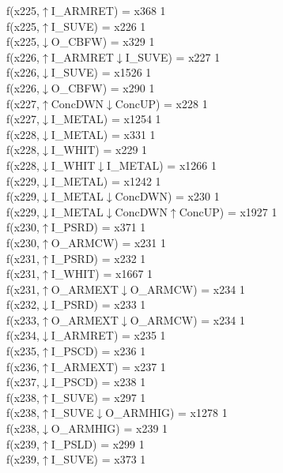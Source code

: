 f(x225,$\uparrow$I\_ARMRET) = x368 {1} \\
f(x225,$\uparrow$I\_SUVE) = x226 {1} \\
f(x225,$\downarrow$O\_CBFW) = x329 {1} \\
f(x226,$\uparrow$I\_ARMRET$\downarrow$I\_SUVE) = x227 {1} \\
f(x226,$\downarrow$I\_SUVE) = x1526 {1} \\
f(x226,$\downarrow$O\_CBFW) = x290 {1} \\
f(x227,$\uparrow$ConcDWN$\downarrow$ConcUP) = x228 {1} \\
f(x227,$\downarrow$I\_METAL) = x1254 {1} \\
f(x228,$\downarrow$I\_METAL) = x331 {1} \\
f(x228,$\downarrow$I\_WHIT) = x229 {1} \\
f(x228,$\downarrow$I\_WHIT$\downarrow$I\_METAL) = x1266 {1} \\
f(x229,$\downarrow$I\_METAL) = x1242 {1} \\
f(x229,$\downarrow$I\_METAL$\downarrow$ConcDWN) = x230 {1} \\
f(x229,$\downarrow$I\_METAL$\downarrow$ConcDWN$\uparrow$ConcUP) = x1927 {1} \\
f(x230,$\uparrow$I\_PSRD) = x371 {1} \\
f(x230,$\uparrow$O\_ARMCW) = x231 {1} \\
f(x231,$\uparrow$I\_PSRD) = x232 {1} \\
f(x231,$\uparrow$I\_WHIT) = x1667 {1} \\
f(x231,$\uparrow$O\_ARMEXT$\downarrow$O\_ARMCW) = x234 {1} \\
f(x232,$\downarrow$I\_PSRD) = x233 {1} \\
f(x233,$\uparrow$O\_ARMEXT$\downarrow$O\_ARMCW) = x234 {1} \\
f(x234,$\downarrow$I\_ARMRET) = x235 {1} \\
f(x235,$\uparrow$I\_PSCD) = x236 {1} \\
f(x236,$\uparrow$I\_ARMEXT) = x237 {1} \\
f(x237,$\downarrow$I\_PSCD) = x238 {1} \\
f(x238,$\uparrow$I\_SUVE) = x297 {1} \\
f(x238,$\uparrow$I\_SUVE$\downarrow$O\_ARMHIG) = x1278 {1} \\
f(x238,$\downarrow$O\_ARMHIG) = x239 {1} \\
f(x239,$\uparrow$I\_PSLD) = x299 {1} \\
f(x239,$\uparrow$I\_SUVE) = x373 {1} \\
